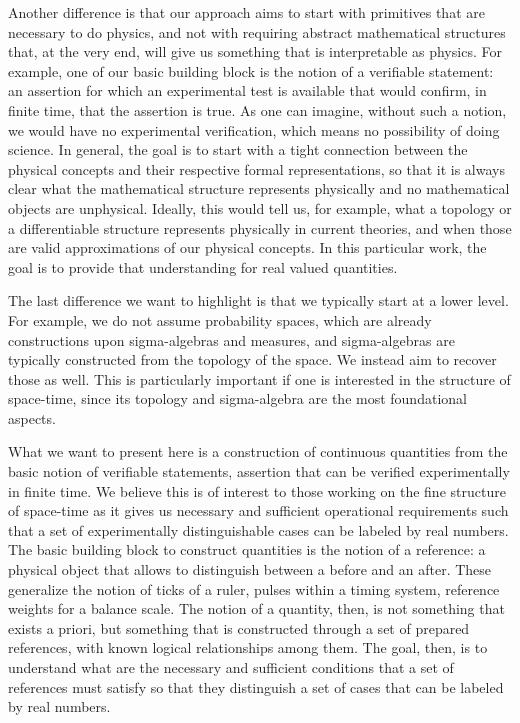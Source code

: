 \documentclass{article}
\begin{document}
Another difference is that our approach aims to start with primitives that are necessary to do physics, and not with requiring abstract mathematical structures that, at the very end, will give us something that is interpretable as physics. For example, one of our basic building block is the notion of a verifiable statement: an assertion for which an experimental test is available that would confirm, in finite time, that the assertion is true. As one can imagine, without such a notion, we would have no experimental verification, which means no possibility of doing science. In general, the goal is to start with a tight connection between the physical concepts and their respective formal representations, so that it is always clear what the mathematical structure represents physically and no mathematical objects are unphysical. Ideally, this would tell us, for example, what a topology or a differentiable structure represents physically in current theories, and when those are valid approximations of our physical concepts. In this particular work, the goal is to provide that understanding for real valued quantities.

The last difference we want to highlight is that we typically start at a lower level. For example, we do not assume probability spaces, which are already constructions upon sigma-algebras and measures, and sigma-algebras are typically constructed from the topology of the space. We instead aim to recover those as well. This is particularly important if one is interested in the structure of space-time, since its topology and sigma-algebra are the most foundational aspects.

What we want to present here is a construction of continuous quantities from the basic notion of verifiable statements, assertion that can be verified experimentally in finite time. We believe this is of interest to those working on the fine structure of space-time as it gives us necessary and sufficient operational requirements such that a set of experimentally distinguishable cases can be labeled by real numbers. The basic building block to construct quantities is the notion of a reference: a physical object that allows to distinguish between a before and an after. These generalize the notion of ticks of a ruler, pulses within a timing system, reference weights for a balance scale. The notion of a quantity, then, is not something that exists a priori, but something that is constructed through a set of prepared references, with known logical relationships among them. The goal, then, is to understand what are the necessary and sufficient conditions that a set of references must satisfy so that they distinguish a set of cases that can be labeled by real numbers.
\end{document}
